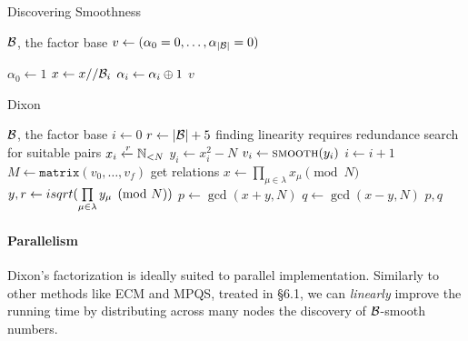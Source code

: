 \begin{algorithm}
  \caption{Discovering Smoothness}
  \begin{algorithmic}[1]
    \Require $\mathcal{B}$, the factor base
      \State $v \gets (\alpha_0 = 0, \ldots, \alpha_{|\mathcal{B}|} = 0)$

       $\alpha_0 \gets 1$ \EndIf
          \State $x \gets x// \mathcal{B}_i$
          \State $\alpha_i \gets \alpha_i \oplus 1$
        \EndWhile
      \EndFor
        \State \Return $v$
      \Else
        \State \Return {}
      \EndIf
    \EndProcedure
  \end{algorithmic}
\end{algorithm}

\begin{algorithm}
  \caption{Dixon}
  \begin{algorithmic}[1]
    \Require $\mathcal{B}$, the factor base
    \State $i \gets 0$
    \State $r \gets |\mathcal{B}| + 5$
    \Comment finding linearity requires redundance
    \Comment search for suitable pairs
    \State $x_i \xleftarrow{r} \mathbb{N}_{< N}$
    \State $y_i \gets x_i^2 - N$
    \State $v_i \gets \textsc{smooth}(y_i)$
     $i \gets i+1$ \EndIf
  \EndWhile
  \State $M \gets \texttt{matrix}(v_0, \ldots, v_f)$
  \Comment get relations
    \State $x \gets \prod\limits_{\mu \in \lambda} x_\mu \pmod{N}$
    \State $y, r \gets isqrt(\prod\limits_{\mu \in \lambda} y_\mu \pmod{N})$
      \State $p \gets \gcd(x+y, N)$
      \State $q \gets \gcd(x-y, N)$
      \State \Return $p, q$
    \EndIf
  \EndFor
  \EndFunction
  \end{algorithmic}
\end{algorithm}

\paragraph{Parallelism}

Dixon's factorization is ideally suited to parallel implementation. Similarly to
other methods like ECM and MPQS, treated in \cite{brent:parallel} \S 6.1,
we can \emph{linearly} improve the running time by distributing across many
nodes the discovery of $\mathcal{B}$-smooth numbers.


